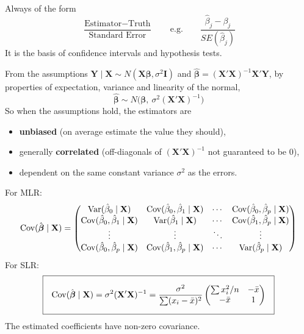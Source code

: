 \begin{definition}
    Always of the form
    \[\boxed{\frac{\text{Estimator}-\text{Truth}}{\text{Standard Error}}}
    \qquad\text{e.g.}\qquad \frac{\hat\beta_j-\beta_j}{SE(\hat\beta_j)}\]
    It is the basis of confidence intervals and hypothesis tests.
\end{definition}

\begin{theorem}
    From the assumptions $\mathbf{Y}\mid\mathbf{X}\sim N(\mathbf{X}\boldsymbol\beta,\sigma^2\mathbf{I})$
    and $\hat{\boldsymbol\beta}=(\mathbf{X}'\mathbf{X})^{-1}\mathbf{X}'\mathbf{Y}$, by
    properties of expectation, variance and linearity of the normal,
    \[\boxed{\hat{\boldsymbol\beta}\sim N\big(\boldsymbol\beta,\ \sigma^2(\mathbf{X}'\mathbf{X})^{-1}\big)}\]
    So when the assumptions hold, the estimators are
    \begin{itemize}
        \item \textbf{unbiased} (on average estimate the value they should),
        \item generally \textbf{correlated} (off-diagonals of $(\mathbf{X}'\mathbf{X})^{-1}$ not guaranteed to be 0),
        \item dependent on the same constant variance $\sigma^2$ as the errors.
    \end{itemize}
\end{theorem}

\begin{definition}
    For MLR:
    \[\operatorname{Cov}(\hat{\boldsymbol\beta}\mid\mathbf{X})=
    \begin{pmatrix}
        \operatorname{Var}(\hat\beta_0\mid\mathbf{X}) & \operatorname{Cov}(\hat\beta_0,\hat\beta_1\mid\mathbf{X}) & \cdots & \operatorname{Cov}(\hat\beta_0,\hat\beta_p\mid\mathbf{X})\\
        \operatorname{Cov}(\hat\beta_0,\hat\beta_1\mid\mathbf{X}) & \operatorname{Var}(\hat\beta_1\mid\mathbf{X}) & \cdots & \operatorname{Cov}(\hat\beta_1,\hat\beta_p\mid\mathbf{X})\\
        \vdots & \vdots & \ddots & \vdots\\
        \operatorname{Cov}(\hat\beta_0,\hat\beta_p\mid\mathbf{X}) & \operatorname{Cov}(\hat\beta_1,\hat\beta_p\mid\mathbf{X}) & \cdots & \operatorname{Var}(\hat\beta_p\mid\mathbf{X})
    \end{pmatrix}\]
    For SLR:
    \[\boxed{\Cov(\hat{\boldsymbol\beta}\mid\mathbf{X})=\sigma^2(\mathbf{X}'\mathbf{X})^{-1}
    =\frac{\sigma^2}{\sum(x_i-\bar x)^2}\begin{pmatrix}\sum x_i^2/n & -\bar x\\ -\bar x & 1\end{pmatrix}}\]
    The estimated coefficients have non-zero covariance.
\end{definition}

